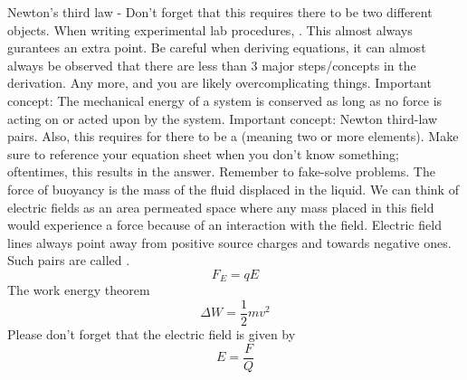 \markdownRendererInterblockSeparator
{}Newton's third law - Don't forget that this requires there to be two different objects.\markdownRendererInterblockSeparator
{}\markdownRendererInterblockSeparator
{}\markdownRendererUlBeginTight
\markdownRendererUlItem When writing experimental lab procedures, . This almost always gurantees an extra point.\markdownRendererUlItemEnd 
\markdownRendererUlItem Be careful when deriving equations, it can almost always be observed that there are less than 3 major steps/concepts in the derivation. Any more, and you are likely overcomplicating things.\markdownRendererUlItemEnd 
\markdownRendererUlItem Important concept: The mechanical energy of a system is conserved as long as no force is acting on or acted upon by the system.\markdownRendererUlItemEnd 
\markdownRendererUlItem Important concept: Newton third-law pairs. Also, this requires for there to be a  (meaning two or more elements).\markdownRendererUlItemEnd 
\markdownRendererUlItem Make sure to reference your equation sheet when you don't know something; oftentimes, this results in the answer.\markdownRendererUlItemEnd 
\markdownRendererUlItem Remember to fake-solve problems.\markdownRendererUlItemEnd 
\markdownRendererUlEndTight \markdownRendererInterblockSeparator
{}\markdownRendererInterblockSeparator
{}\markdownRendererUlBeginTight
\markdownRendererUlItem The force of buoyancy is the mass of the fluid displaced in the liquid.\markdownRendererUlItemEnd 
\markdownRendererUlEndTight \markdownRendererInterblockSeparator
{}\markdownRendererInterblockSeparator
{}\markdownRendererUlBegin
\markdownRendererUlItem We can think of electric fields as an area permeated space where any mass placed in this field would experience a force because of an interaction with the field.\markdownRendererUlItemEnd 
\markdownRendererUlItem Electric field lines always point away from positive source charges and towards negative ones. Such pairs are called .\markdownRendererUlItemEnd 
\markdownRendererUlEnd \markdownRendererInterblockSeparator
{}$$ F_E = qE $$\markdownRendererInterblockSeparator
{}\markdownRendererUlBegin
\markdownRendererUlItem The work energy theorem $$\Delta W = \frac{1}{2}mv^2$$\markdownRendererUlItemEnd 
\markdownRendererUlItem Please don't forget that the electric field is given by $$E = \frac{F}{Q}$$\markdownRendererUlItemEnd 
